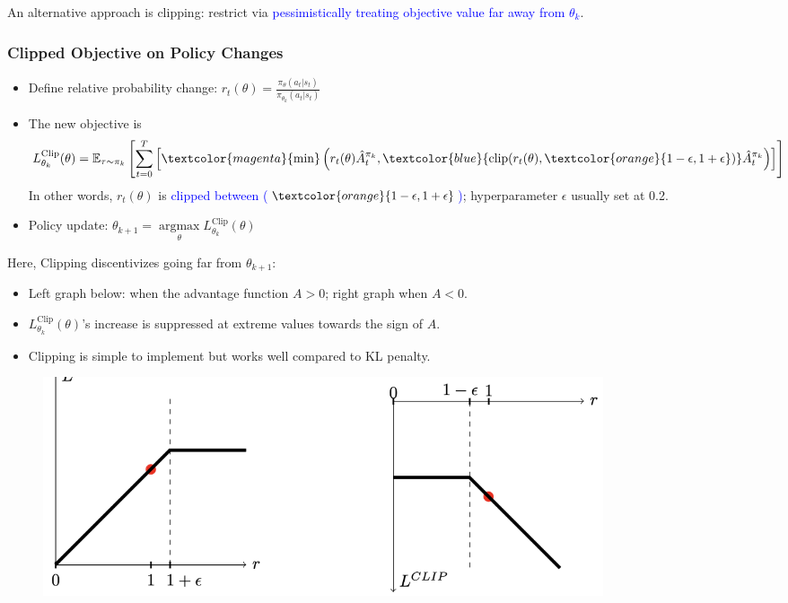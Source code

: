 \documentclass{article}
\begin{document}
An alternative approach is clipping: restrict via \textcolor{blue}{pessimistically treating objective value far away from $\theta_k$}.
\begin{thmbox}
    \subsubsection*{Clipped Objective on Policy Changes}
    \begin{itemize}
    \item Define relative probability change: $r_{t}(\theta) = \frac{\pi_{\theta} (a_t | s_t)}{\pi_{\theta_k} (a_t | s_t)}$ 
    \item The new objective is
        \begin{equation*}
            L_{\theta_{k}}^{\text{Clip}} (\theta) 
            = \mathbb{E}_{\tau \sim \pi_{k}} \left[ \sum_{t = 0}^{T} \left[ \textcolor{magenta}{\min} \left( r_{t} (\theta) \hat{A}_t^{\pi_{k}}, \textcolor{blue}{\text{clip}(r_{t}(\theta), \textcolor{orange}{1 - \epsilon, 1 + \epsilon})} \hat{A}_t^{\pi_{k}} \right) \right] \right]
        \end{equation*}
        In other words, $r_{t} (\theta)$ is \textcolor{blue}{clipped between ($\textcolor{orange}{1 - \epsilon, 1 + \epsilon}$)}; hyperparameter $\epsilon$ usually set at 0.2.
    \item Policy update: $\theta_{k+1} = \mathop{\arg\max}\limits_{\theta} L_{\theta_{k}}^{\text{Clip}} (\theta)$
    \end{itemize}
\end{thmbox}

Here, Clipping discentivizes going far from $\theta_{k+1}$:
\begin{itemize}
\item Left graph below: when the advantage function $A > 0$; right graph when $A < 0$.
\item $L_{\theta_{k}}^{\text{Clip}} (\theta)$'s increase is suppressed at extreme values towards the sign of $A$.
\item Clipping is simple to implement but works well compared to KL penalty.
\end{itemize}

\begin{figure}
    \includegraphics[width=0.8\textwidth]{lec6-clipped-values.png}
\end{figure}
\end{document}

